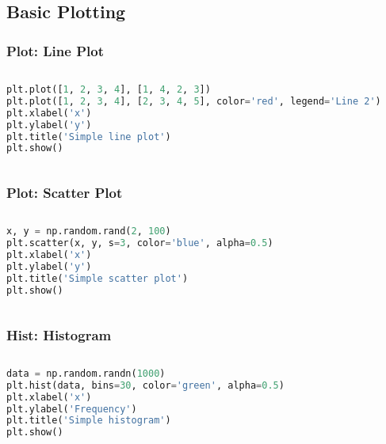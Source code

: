 \documentclass[beamer, en, version=2.0]{huangfusl-template}
\begin{document}
    \subsection{Basic Plotting}
    \begin{frame}[fragile]
        \frametitle{Plot: Line Plot}

        \begin{columns}
        \begin{column}{0.5\textwidth}
\begin{lstlisting}[language=python, breaklines]
plt.plot([1, 2, 3, 4], [1, 4, 2, 3])
plt.plot([1, 2, 3, 4], [2, 3, 4, 5], color='red', legend='Line 2')
plt.xlabel('x')
plt.ylabel('y')
plt.title('Simple line plot')
plt.show()
\end{lstlisting}
        \end{column}
        \begin{column}{0.5\textwidth}
            
        \end{column}
        \end{columns}
    \end{frame}
    \begin{frame}[fragile]
        \frametitle{Plot: Scatter Plot}

        \begin{columns}
        \begin{column}{0.5\textwidth}
\begin{lstlisting}[language=python, breaklines]
x, y = np.random.rand(2, 100)
plt.scatter(x, y, s=3, color='blue', alpha=0.5)
plt.xlabel('x')
plt.ylabel('y')
plt.title('Simple scatter plot')
plt.show()
\end{lstlisting}
        \end{column}
        \begin{column}{0.5\textwidth}
            
        \end{column}
        \end{columns}
    \end{frame}
    \begin{frame}[fragile]
        \frametitle{Hist: Histogram}

        \begin{columns}
        \begin{column}{0.5\textwidth}
\begin{lstlisting}[language=python, breaklines]
data = np.random.randn(1000)
plt.hist(data, bins=30, color='green', alpha=0.5)
plt.xlabel('x')
plt.ylabel('Frequency')
plt.title('Simple histogram')
plt.show()
\end{lstlisting}
        \end{column}
        \begin{column}{0.5\textwidth}
            
        \end{column}
        \end{columns}
    \end{frame}
\end{document}
